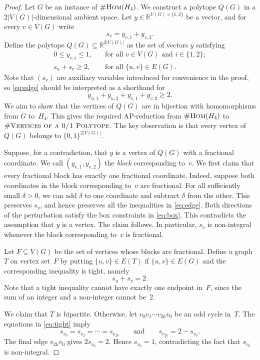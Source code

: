 \documentclass[11pt, oneside]{article}   	%
\def\Rset{\mathbb{R}}
\def\nHom{\textsc{\#Hom}}
\def\nPolytopeVertices{\textsc{\#Vertices of a 0/1 Polytope}}
\newcommand{\abs}[1]{\left\vert#1\right\vert}
\def\Hfour{H_4}
\begin{document}
\begin{proof}
Let $G$ be an instance of $\nHom(\Hfour)$.  
We construct a polytope $Q(G)$ in a $2|V(G)|$-dimensional ambient space.  Let $y\in\mathbb{R}^{V(G)\times\{1,2\}}$ be a vector,
and for every $v\in V(G)$ write
\[
 s_v=y_{v,1}+y_{v,2}.
\]
Define the polytope $Q(G)\subseteq\Rset^{2\abs{V(G)}}$ as the set of vectors $y$ satisfying
\begin{align}
 0\leq y_{v,i}\leq1, &\quad\text{for all $v\in V(G)$ and $i\in\{1,2\}$}; \label{eq:box}\\
 s_u+s_v\geq2,&\quad\text{for all $\{u,v\}\in E(G)$}. \label{eq:edge}
\end{align}
Note that $(s_v)$ are auxiliary variables introduced for convenience in the proof, so \eqref{eq:edge} should be interpreted as a shorthand for 
$$
y_{u,1}+y_{u,2}+y_{v,1}+y_{v,2}\geq2.
$$
We aim to show that the vertices of $Q(G)$ are in bijection with homomorphisms from $G$ to~$\Hfour$.  This gives the required AP-reduction from $\nHom(\Hfour)$ to $\nPolytopeVertices$.
The key observation is that every vertex of $Q(G)$ belongs to $\{0,1\}^{2\abs{V(G)}}$.

Suppose, for a contradiction, that $y$ is a vertex of $Q(G)$ with a fractional coordinate.  We call $(y_{v,1},y_{v,2})$ the \textit{block} corresponding to~$v$.
We first claim that every fractional block has exactly one fractional coordinate.  Indeed, suppose both coordinates in the block corresponding to~$v$ are fractional.  For all sufficiently small $\delta>0$, we can add $\delta$ to one coordinate and subtract $\delta$ from the other.  This preserves $s_v$, and hence preserves all the inequalities in \eqref{eq:edge}.  Both directions of the perturbation satisfy the box constraints in \eqref{eq:box}.  This contradicts the assumption that $y$ is a vertex.  The claim follows.  In particular, $s_v$ is non-integral whenever the block corresponding to~$v$ is fractional.

Let $F\subseteq V(G)$ be the set of vertices whose blocks are fractional.  Define a graph~$T$ on vertex set~$F$ by putting $\{u,v\}\in E(T)$ if $\{u,v\}\in E(G)$ and the corresponding inequality is tight, namely
\begin{equation}\label{eq:tight}
 s_u+s_v=2.
\end{equation}
Note that a tight inequality cannot have exactly one endpoint in~$F$, since the sum of an integer and a non-integer cannot be~2.

We claim that $T$ is bipartite.  Otherwise, let $v_0v_1\cdots v_{2k}v_0$ be an odd cycle in~$T$.  The equations in \eqref{eq:tight} imply
\[
 s_{v_0}=s_{v_2}=\cdots=s_{v_{2k}}
 \qquad\text{and}\qquad
 s_{v_{2k}}=2-s_{v_0}.
\]
The final edge $v_{2k}v_0$ gives $2s_{v_0}=2$.  Hence $s_{v_0}=1$, contradicting the fact that $s_{v_0}$ is non-integral.


\end{proof}
\end{document}
